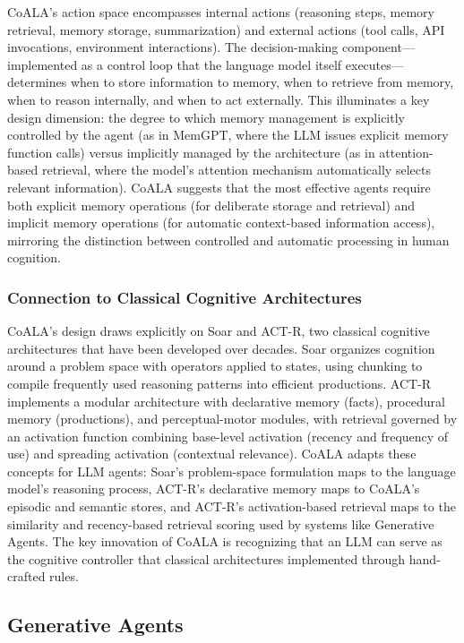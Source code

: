 \documentclass[11pt,letterpaper]{article}
\begin{document}
CoALA's action space encompasses internal actions (reasoning steps, memory retrieval, memory storage, summarization) and external actions (tool calls, API invocations, environment interactions). The decision-making component---implemented as a control loop that the language model itself executes---determines when to store information to memory, when to retrieve from memory, when to reason internally, and when to act externally. This illuminates a key design dimension: the degree to which memory management is explicitly controlled by the agent (as in MemGPT, where the LLM issues explicit memory function calls) versus implicitly managed by the architecture (as in attention-based retrieval, where the model's attention mechanism automatically selects relevant information). CoALA suggests that the most effective agents require both explicit memory operations (for deliberate storage and retrieval) and implicit memory operations (for automatic context-based information access), mirroring the distinction between controlled and automatic processing in human cognition.

\subsubsection{Connection to Classical Cognitive Architectures}

CoALA's design draws explicitly on Soar and ACT-R, two classical cognitive architectures that have been developed over decades. Soar organizes cognition around a problem space with operators applied to states, using chunking to compile frequently used reasoning patterns into efficient productions. ACT-R implements a modular architecture with declarative memory (facts), procedural memory (productions), and perceptual-motor modules, with retrieval governed by an activation function combining base-level activation (recency and frequency of use) and spreading activation (contextual relevance). CoALA adapts these concepts for LLM agents: Soar's problem-space formulation maps to the language model's reasoning process, ACT-R's declarative memory maps to CoALA's episodic and semantic stores, and ACT-R's activation-based retrieval maps to the similarity and recency-based retrieval scoring used by systems like Generative Agents. The key innovation of CoALA is recognizing that an LLM can serve as the cognitive controller that classical architectures implemented through hand-crafted rules.

\subsection{Generative Agents}
\label{subsec:generative_agents}
\end{document}
